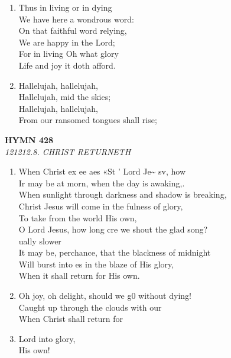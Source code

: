 \documentclass[11pt,a4paper]{article}
\begin{document}
\begin{enumerate}
    \item Thus in living or in dying \\
        We have here a wondrous word: \\
        On that faithful word relying, \\
        We are happy in the Lord; \\
        For in living Oh what glory \\
        Life and joy it doth afford.

    \item Hallelujah, hallelujah, \\
        Hallelujah, mid the skies; \\
        Hallelujah, hallelujah, \\
        From our ransomed tongues shall rise;

\end{enumerate}

\newpage
\begin{center}
    {\Large \textbf{HYMN 428}}
    \\
    \textit{121212.8. CHRIST RETURNETH}
\end{center}
\vspace{1em}

\begin{enumerate}
    \item When Christ ex ee aes «St ' Lord Je\textasciitilde{} sv, how \\
        Ir may be at morn, when the day is awaking,. \\
        When sunlight through darkness and shadow is breaking, \\
        Christ Jesus will come in the fulness of glory, \\
        To take from the world His own, \\
        O Lord Jesus, how long cre we shout the glad song? \\
        ually slower \\
        It may be, perchance, that the blackness of midnight \\
        Will burst into es in the blaze of His glory, \\
        When it shall return for His own.

    \item Oh joy, oh delight, should we g0 without dying! \\
        Caught up through the clouds with our \\
        When Christ shall return for

    \item Lord into glory, \\
        His own!

\end{enumerate}
\end{document}
